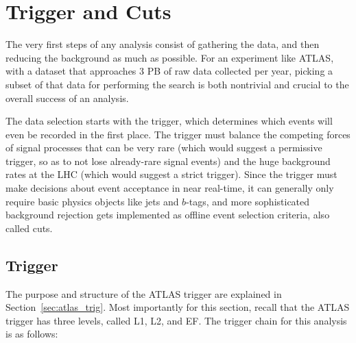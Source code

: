 

\chapter[Trigger and Cuts]{Trigger and Cuts}

The very first steps of any analysis consist of gathering the data, and then reducing the background
as much as possible.  For an experiment like ATLAS, with a dataset that approaches 3 PB of raw
data collected per year, picking a subset of that data for performing the search is both nontrivial
and crucial to the overall success of an analysis.  

The data selection starts with the trigger, which determines which events will even be recorded in the
first place.  The trigger must balance the competing forces of signal processes that can be very rare
(which would suggest a permissive trigger, so as to not lose already-rare signal events) and the
huge background rates at the LHC (which would suggest a strict trigger).  Since the trigger must make
decisions about event acceptance in near real-time, it can generally only require basic physics objects
like jets and $b$-tags, and more sophisticated background rejection gets implemented as offline event 
selection criteria, also called cuts.  

 
\section{Trigger}
\label{sec:my_trigger}
The purpose and structure of the ATLAS trigger are explained in Section~\ref{sec:atlas_trig}.
Most importantly for this section, recall that the ATLAS trigger has three levels, called L1,
L2, and EF.  The trigger chain for this analysis is as follows: 

